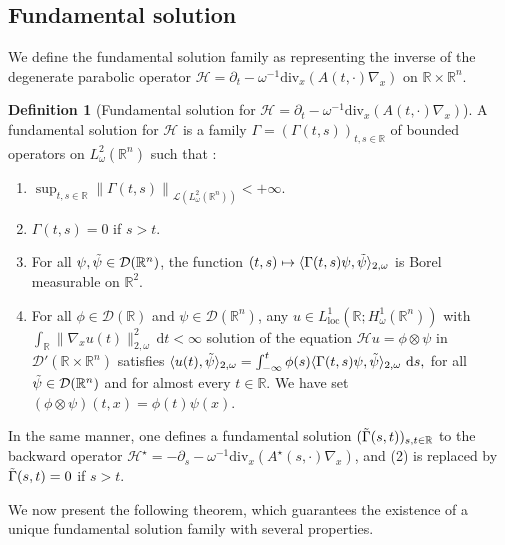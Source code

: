 \documentclass[12pt, letterpaper]{amsart}
\theoremstyle{definition}
\newtheorem{defn}[thm]{Definition}
\theoremstyle{remark}
\numberwithin{equation}{section}
\begin{document}
\subsection{Fundamental solution}
We define the fundamental solution family as representing the inverse of the degenerate parabolic operator $\mathcal{H}=\partial_t - \omega^{-1}\mathrm{div}_x(A(t,\cdot) \nabla_x)$ on $\mathbb{R}\times \mathbb{R}^n$.
\begin{defn}[Fundamental solution for $\mathcal{H}=\partial_t - \omega^{-1}\mathrm{div}_x(A(t,\cdot) \nabla_x)$]
A fundamental solution for $\mathcal{H}$ is a family $\Gamma=(\Gamma(t,s))_{t,s \in \mathbb{R}}$ of bounded operators on $L^2_\omega(\mathbb{R}^n)$ such that :
\begin{enumerate}
        \item $\sup_{t,s \in \mathbb{R}} \left\|\Gamma(t,s) \right\|_{\mathcal{L}(L^2_\omega(\mathbb{R}^n))} < +\infty.$
        \item $\Gamma(t,s)=0$ if $s>t$.
        \item For all $\psi,\Tilde{\psi}\in \mathcal{D}(\mathbb{R}^n)$, the function $(t,s) \mapsto \langle \Gamma(t,s)\psi, \Tilde{\psi} \rangle_{2,\omega}$ is Borel measurable on $\mathbb{R}^2$.
        \item For all $\phi \in \mathcal{D}(\mathbb{R})$ and $\psi \in \mathcal{D}(\mathbb{R}^n)$, any $u \in L^1_{\mathrm{loc}}(\mathbb{R};H^1_\omega(\mathbb{R}^n))$ with $\int_\mathbb{R}\|\nabla_x u(t)\|^2_{2,\omega}\, \mathrm{d}t<\infty$ solution of the equation $\mathcal{H}u = \phi \otimes \psi $ in $\mathcal{D}'(\mathbb{R}\times\mathbb{R}^{n})$ satisfies $\langle u(t), \Tilde{\psi} \rangle_{2,\omega} = \int_{-\infty}^{t} \phi(s) \langle \Gamma (t,s)\psi, \Tilde{\psi} \rangle_{2,\omega} \ \mathrm{d}s,$ for all $\Tilde{\psi} \in \mathcal{D}(\mathbb{R}^n)$ and for almost every $t\in \mathbb{R}$. We have set $(\phi \otimes \psi)(t,x)=\phi(t) \psi(x)$.
\end{enumerate}
In the same manner, one defines a fundamental solution $(\Tilde{\Gamma}(s,t))_{s,t \in \mathbb{R}}$ to the backward operator \( \mathcal{H}^\star=-\partial_s - \omega^{-1}\mathrm{div}_x ( A^\star(s,\cdot) \nabla_x) \), and (2) is replaced by $\Tilde{\Gamma}(s,t) = 0$ if $s > t$.
\end{defn}
We now present the following theorem, which guarantees the existence of a unique fundamental solution family with several properties.
\end{document}
